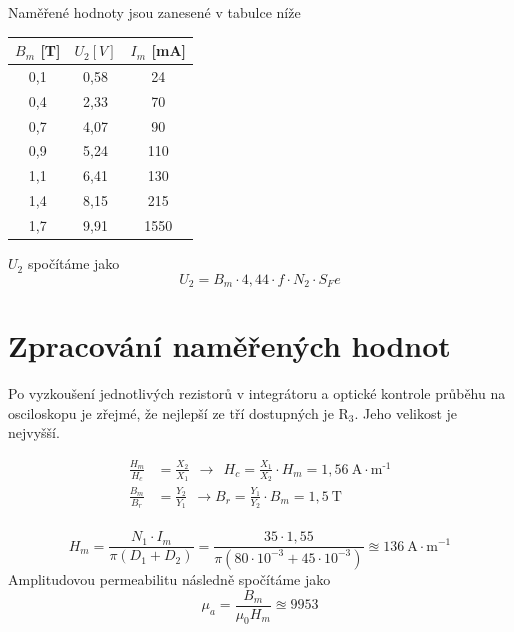 \documentclass[a4paper,12pt]{article}   %
\begin{document}
Naměřené hodnoty jsou zanesené v tabulce níže
\begin{table}[h!]
  \centering
  \begin{tabular}{|c|c|c|}
  \hline
  $B_m$ [T] &$U_\text{2} [V]$& $I_m$ [mA]\\\hline\hline
  0,1 & 0,58  & 24   \\ \hline
  0,4 & 2,33  & 70   \\ \hline
  0,7 & 4,07  & 90   \\ \hline
  0,9 & 5,24  & 110  \\ \hline
  1,1 & 6,41  & 130  \\ \hline
  1,4 & 8,15  & 215  \\ \hline
  1,7 & 9,91  & 1550 \\ \hline
  \end{tabular}
\end{table}
$U_2$ spočítáme jako
\begin{equation}
  U_2 = B_m\cdot 4,44 \cdot f\cdot N_2\cdot S_Fe
\end{equation}

\section{Zpracování naměřených hodnot}
\label{chap:zpracovani_hodnot}

Po vyzkoušení jednotlivých rezistorů v integrátoru a optické kontrole průběhu na osciloskopu je zřejmé, že nejlepší ze tří dostupných je $\text{R}_\text{3}$. Jeho velikost je nejvyšší.

\begin{equation}
  \begin{split}
    \frac{H_m}{H_c} &= \frac{X_2}{X_1} ~~\rightarrow~~H_c = \frac{X_1}{X_2}\cdot H_m = 1,56~\text{A}\cdot\text{m}^\text{-1}\\
    \frac{B_m}{B_r} &= \frac{Y_2}{Y_1} ~~\rightarrow B_r = \frac{Y_1}{Y_2}\cdot B_m = 1,5~\text{T}\\
  \end{split}
\end{equation}

\begin{equation}
  H_m = \frac{N_1\cdot I_m}{\pi (D_1 + D_2)} = \frac{35 \cdot 1,55}{\pi (80\cdot 10^{-3} + 45\cdot 10^{-3})} \approxeq 136~\text{A}\cdot\text{m}^{-1}
\end{equation}
Amplitudovou permeabilitu následně spočítáme jako 
\begin{equation}
  \mu_a=\frac{B_m}{\mu_0 H_m} \approxeq 9953
\end{equation}
\end{document}
